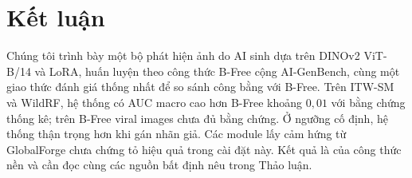 \documentclass[11pt,a4paper]{article}
\begin{document}
\section{Kết luận}\label{sec:conclusion}
Chúng tôi trình bày một bộ phát hiện ảnh do AI sinh dựa trên DINOv2 ViT-B/14 và LoRA, huấn luyện theo công thức B-Free cộng AI-GenBench, cùng một giao thức đánh giá thống nhất để so sánh công bằng với B-Free. Trên ITW-SM và WildRF, hệ thống có AUC macro cao hơn B-Free khoảng $0{,}01$ với bằng chứng thống kê; trên B-Free viral images chưa đủ bằng chứng. Ở ngưỡng cố định, hệ thống thận trọng hơn khi gán nhãn giả. Các module lấy cảm hứng từ GlobalForge chưa chứng tỏ hiệu quả trong cài đặt này. Kết quả là của công thức nền và cần đọc cùng các nguồn bất định nêu trong Thảo luận.

\appendix
\renewcommand{\thesection}{\Alph{section}}
\end{document}

